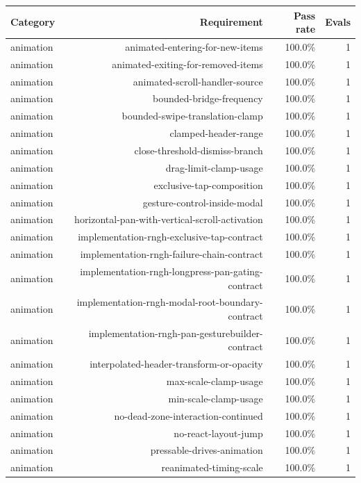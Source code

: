 \begin{table}[htbp]
\centering
\begin{tabular}{lrrr}
\toprule
Category & Requirement & Pass rate & Evals \\
\midrule
animation & animated-entering-for-new-items & 100.0\% & 1 \\
animation & animated-exiting-for-removed-items & 100.0\% & 1 \\
animation & animated-scroll-handler-source & 100.0\% & 1 \\
animation & bounded-bridge-frequency & 100.0\% & 1 \\
animation & bounded-swipe-translation-clamp & 100.0\% & 1 \\
animation & clamped-header-range & 100.0\% & 1 \\
animation & close-threshold-dismiss-branch & 100.0\% & 1 \\
animation & drag-limit-clamp-usage & 100.0\% & 1 \\
animation & exclusive-tap-composition & 100.0\% & 1 \\
animation & gesture-control-inside-modal & 100.0\% & 1 \\
animation & horizontal-pan-with-vertical-scroll-activation & 100.0\% & 1 \\
animation & implementation-rngh-exclusive-tap-contract & 100.0\% & 1 \\
animation & implementation-rngh-failure-chain-contract & 100.0\% & 1 \\
animation & implementation-rngh-longpress-pan-gating-contract & 100.0\% & 1 \\
animation & implementation-rngh-modal-root-boundary-contract & 100.0\% & 1 \\
animation & implementation-rngh-pan-gesturebuilder-contract & 100.0\% & 1 \\
animation & interpolated-header-transform-or-opacity & 100.0\% & 1 \\
animation & max-scale-clamp-usage & 100.0\% & 1 \\
animation & min-scale-clamp-usage & 100.0\% & 1 \\
animation & no-dead-zone-interaction-continued & 100.0\% & 1 \\
animation & no-react-layout-jump & 100.0\% & 1 \\
animation & pressable-drives-animation & 100.0\% & 1 \\
animation & reanimated-timing-scale & 100.0\% & 1 \\

\end{tabular}
\end{table}
